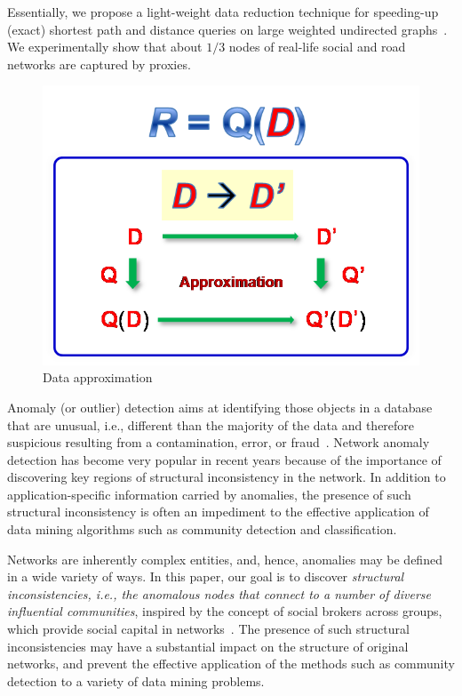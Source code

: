 Essentially, we propose a light-weight data reduction technique for speeding-up (exact)  shortest path and distance queries on large weighted undirected graphs~\cite{MaFLWCH16}. We experimentally show that about $1/3$  nodes of real-life social and road networks  are captured by proxies.



\begin{figure}[tb!]
  \begin{center}
  \includegraphics[scale=0.45]{./dataApprox.png}
  \end{center}
  \caption{Data approximation}\label{fig-tech-dataappro}
  \vspace{-1ex}
\end{figure}


Anomaly (or outlier) detection aims at identifying those objects in a database that are unusual, i.e., different than the majority of the data and therefore suspicious resulting from a contamination, error, or fraud~\cite{Zimek2017}. Network anomaly detection has become very popular
in recent years because of the importance of discovering key
regions of structural inconsistency in the network. In addition
to application-specific information carried by anomalies, the
presence of such structural inconsistency is often an impediment
to the effective application of data mining algorithms such as
community detection and classification.


Networks are inherently complex entities, and, hence, anomalies may be defined in a wide variety of ways.
In this paper, our goal is to discover {\em  structural inconsistencies, i.e.,  the anomalous nodes that connect to a number of diverse influential communities}, inspired by the concept of social brokers across groups, which provide social capital in networks~\cite{s-hole04}.
The presence of such structural inconsistencies may have a substantial impact on the structure of original networks, and prevent the effective application of the methods such as community detection to a variety of data mining problems.


